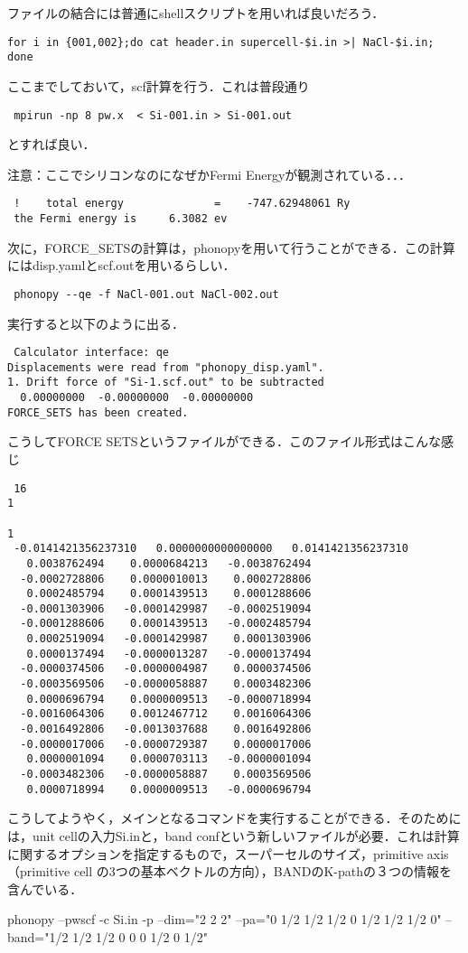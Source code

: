 \documentclass[a4j]{jarticle}
\begin{document}
ファイルの結合には普通にshellスクリプトを用いれば良いだろう．

\begin{lstlisting}
for i in {001,002};do cat header.in supercell-$i.in >| NaCl-$i.in; done 
\end{lstlisting}


ここまでしておいて，scf計算を行う．これは普段通り

\begin{lstlisting}
 mpirun -np 8 pw.x  < Si-001.in > Si-001.out
\end{lstlisting}

とすれば良い．

注意：ここでシリコンなのになぜかFermi Energyが観測されている．．．

\begin{lstlisting}
 !    total energy              =    -747.62948061 Ry
 the Fermi energy is     6.3082 ev
\end{lstlisting}

次に，FORCE_SETSの計算は，phonopyを用いて行うことができる．この計算にはdisp.yamlとscf.outを用いるらしい．
\begin{lstlisting}
 phonopy --qe -f NaCl-001.out NaCl-002.out
\end{lstlisting}

実行すると以下のように出る．
\begin{lstlisting}
 Calculator interface: qe
Displacements were read from "phonopy_disp.yaml".
1. Drift force of "Si-1.scf.out" to be subtracted
  0.00000000  -0.00000000  -0.00000000
FORCE_SETS has been created.
\end{lstlisting}
こうしてFORCE SETSというファイルができる．このファイル形式はこんな感じ
\begin{lstlisting}
 16
1

1
 -0.0141421356237310   0.0000000000000000   0.0141421356237310
   0.0038762494    0.0000684213   -0.0038762494
  -0.0002728806    0.0000010013    0.0002728806
   0.0002485794    0.0001439513    0.0001288606
  -0.0001303906   -0.0001429987   -0.0002519094
  -0.0001288606    0.0001439513   -0.0002485794
   0.0002519094   -0.0001429987    0.0001303906
   0.0000137494   -0.0000013287   -0.0000137494
  -0.0000374506   -0.0000004987    0.0000374506
  -0.0003569506   -0.0000058887    0.0003482306
   0.0000696794    0.0000009513   -0.0000718994
  -0.0016064306    0.0012467712    0.0016064306
  -0.0016492806   -0.0013037688    0.0016492806
  -0.0000017006   -0.0000729387    0.0000017006
   0.0000001094    0.0000703113   -0.0000001094
  -0.0003482306   -0.0000058887    0.0003569506
   0.0000718994    0.0000009513   -0.0000696794
\end{lstlisting}

こうしてようやく，メインとなるコマンドを実行することができる．そのためには，unit cellの入力Si.inと，band confという新しいファイルが必要．これは計算に関するオプションを指定するもので，スーパーセルのサイズ，primitive axis （primitive cell の3つの基本ベクトルの方向），BANDのK-pathの３つの情報を含んでいる．


 phonopy --pwscf -c Si.in -p --dim="2 2 2" --pa="0 1/2 1/2 1/2 0 1/2 1/2 1/2 0" --band="1/2 1/2 1/2 0 0 0 1/2 0 1/2"
\end{document}
